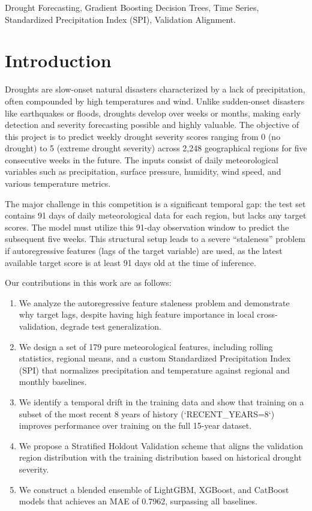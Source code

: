 \documentclass[conference]{IEEEtran}
\begin{document}
\begin{IEEEkeywords}
Drought Forecasting, Gradient Boosting Decision Trees, Time Series, Standardized Precipitation Index (SPI), Validation Alignment.
\end{IEEEkeywords}

\section{Introduction}
Droughts are slow-onset natural disasters characterized by a lack of precipitation, often compounded by high temperatures and wind. Unlike sudden-onset disasters like earthquakes or floods, droughts develop over weeks or months, making early detection and severity forecasting possible and highly valuable. The objective of this project is to predict weekly drought severity scores ranging from 0 (no drought) to 5 (extreme drought severity) across 2,248 geographical regions for five consecutive weeks in the future. The inputs consist of daily meteorological variables such as precipitation, surface pressure, humidity, wind speed, and various temperature metrics.

The major challenge in this competition is a significant temporal gap: the test set contains 91 days of daily meteorological data for each region, but lacks any target scores. The model must utilize this 91-day observation window to predict the subsequent five weeks. This structural setup leads to a severe ``staleness'' problem if autoregressive features (lags of the target variable) are used, as the latest available target score is at least 91 days old at the time of inference.

Our contributions in this work are as follows:
\begin{enumerate}
    \item We analyze the autoregressive feature staleness problem and demonstrate why target lags, despite having high feature importance in local cross-validation, degrade test generalization.
    \item We design a set of 179 pure meteorological features, including rolling statistics, regional means, and a custom Standardized Precipitation Index (SPI) that normalizes precipitation and temperature against regional and monthly baselines.
    \item We identify a temporal drift in the training data and show that training on a subset of the most recent 8 years of history (`RECENT\_YEARS=8`) improves performance over training on the full 15-year dataset.
    \item We propose a Stratified Holdout Validation scheme that aligns the validation region distribution with the training distribution based on historical drought severity.
    \item We construct a blended ensemble of LightGBM, XGBoost, and CatBoost models that achieves an MAE of 0.7962, surpassing all baselines.
\end{enumerate}
\end{document}
